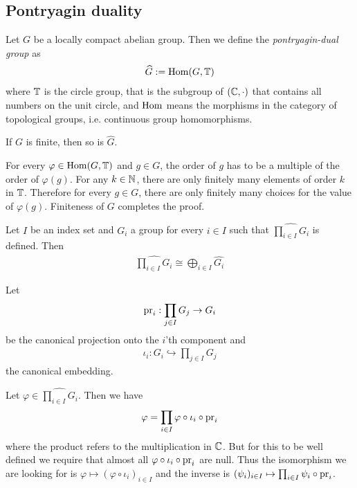 \subsection{Pontryagin duality}

\begin{Definition}
	\label{the_zero_divisor_problem:pontryagin_duality:definition_pontryagin_duality}
	Let $G$ be a locally compact abelian group. Then we define the \emph{pontryagin-dual group} as
	\begin{align*}
		\widehat{G} := \operatorname{Hom}(G,\mathbb{T})
	\end{align*}
	where $\mathbb{T}$ is the circle group, that is the subgroup of $(\mathbb{C},\cdot)$ that contains all numbers on the unit circle, and $\operatorname{Hom}$ means the morphisms in the category of topological groups, i.e. continuous group homomorphisms.
\end{Definition}

\begin{Lemma}
	If $G$ is finite, then so is $\widehat{G}$.
\end{Lemma}

\proof
	For every $\varphi \in \operatorname{Hom}(G,\mathbb{T})$ and $g \in G$, the order of $g$ has to be a multiple of the order of $\varphi(g)$.
	For any $k \in \mathbb{N}$, there are only finitely many elements of order $k$ in $\mathbb{T}$.
	Therefore for every $g \in G$, there are only finitely many choices for the value of $\varphi(g)$.
	Finiteness of $G$ completes the proof.
\endproof

\begin{Lemma}
	\label{the_zero_divisor_problem:pontryagin_duality:lemma_dual_product}
	Let $I$ be an index set and $G_i$ a group for every $i \in I$ such that $\widehat{\prod_{i \in I} G_i}$ is defined. Then
	\begin{align*}
		\widehat{\prod_{i \in I} G_i} \cong \bigoplus_{i \in I} \widehat{G_i}
	\end{align*}
\end{Lemma}

\proof
	Let
	\begin{align*}
		\operatorname{pr}_i: \prod_{j \in I} G_j \to G_i
	\end{align*}
	be the canonical projection onto the $i$'th component and
	\begin{align*}
		\iota_i: G_i \hookrightarrow \prod_{j \in I} G_j
	\end{align*}
	the canonical embedding.

	Let $\varphi \in \widehat{\prod_{i \in I} G_i}$. Then we have
	\begin{align*}
		\varphi = \prod_{i \in I} \varphi \circ \iota_i \circ \operatorname{pr}_i
	\end{align*}
	where the product refers to the multiplication in $\mathbb{C}$.
	But for this to be well defined we require that almost all $\varphi \circ \iota_i \circ \operatorname{pr}_i$ are null.
	Thus the isomorphism we are looking for is $\varphi \mapsto (\varphi \circ \iota_i)_{i \in I}$ and the inverse is $(\psi_i)_{i \in I} \mapsto \prod_{i \in I} \psi_i \circ \operatorname{pr}_i$.
\endproof

